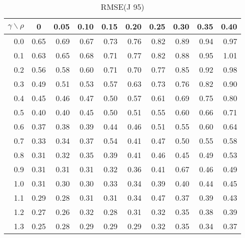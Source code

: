\documentclass[12pt]{article}
\begin{document}
%
\begin{table}[!tbp]
\caption{RMSE(J 95)}
 \begin{center}
 \begin{tabular}{r|rrrrrrrrr}\hline\hline
\multicolumn{1}{c|}{$\gamma\backslash\rho$}&\multicolumn{1}{c}{0}&\multicolumn{1}{c}{0.05}&\multicolumn{1}{c}{0.10}&\multicolumn{1}{c}{0.15}&\multicolumn{1}{c}{0.20}&\multicolumn{1}{c}{0.25}&\multicolumn{1}{c}{0.30}&\multicolumn{1}{c}{0.35}&\multicolumn{1}{c}{0.40}\tabularnewline
\hline

0.0&0.65&0.69&0.67&0.73&0.76&0.82&0.89&0.94&0.97\tabularnewline
0.1&0.63&0.65&0.68&0.71&0.77&0.82&0.88&0.95&1.01\tabularnewline
0.2&0.56&0.58&0.60&0.71&0.70&0.77&0.85&0.92&0.98\tabularnewline
0.3&0.49&0.51&0.53&0.57&0.63&0.73&0.76&0.82&0.90\tabularnewline
0.4&0.45&0.46&0.47&0.50&0.57&0.61&0.69&0.75&0.80\tabularnewline
0.5&0.40&0.40&0.45&0.50&0.51&0.55&0.60&0.66&0.71\tabularnewline
0.6&0.37&0.38&0.39&0.44&0.46&0.51&0.55&0.60&0.64\tabularnewline
0.7&0.33&0.34&0.37&0.54&0.41&0.47&0.50&0.55&0.58\tabularnewline
0.8&0.31&0.32&0.35&0.39&0.41&0.46&0.45&0.49&0.53\tabularnewline
0.9&0.31&0.31&0.31&0.32&0.36&0.41&0.67&0.46&0.49\tabularnewline
1.0&0.31&0.30&0.30&0.33&0.34&0.39&0.40&0.44&0.45\tabularnewline
1.1&0.29&0.28&0.31&0.31&0.34&0.47&0.37&0.39&0.43\tabularnewline
1.2&0.27&0.26&0.32&0.28&0.31&0.32&0.35&0.38&0.39\tabularnewline
1.3&0.25&0.28&0.29&0.29&0.29&0.32&0.35&0.34&0.37\tabularnewline
\hline
\end{tabular}

\end{center}

\end{table}
\end{document}
